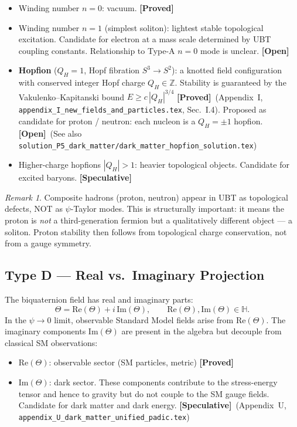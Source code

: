 \documentclass[12pt,a4paper]{article}
\theoremstyle{remark}
\newtheorem{remark}[theorem]{Remark}
\newcommand{\H}{\mathbb{H}}
\newcommand{\Z}{\mathbb{Z}}
\newcommand{\re}{\mathrm{Re}}
\newcommand{\im}{\mathrm{Im}}
\newcommand{\proved}{\textbf{[Proved]}}
\newcommand{\openq}{\textbf{[Open]}}
\newcommand{\speculative}{\textbf{[Speculative]}}
\begin{document}
\begin{itemize}
  \item Winding number $n=0$: vacuum. \proved
  \item Winding number $n=1$ (simplest soliton): lightest stable topological
        excitation.  Candidate for electron at a mass scale determined by UBT
        coupling constants.  Relationship to Type-A $n=0$ mode is unclear.
        \openq
  \item \textbf{Hopfion} ($Q_H=1$, Hopf fibration $S^3\to S^2$): a knotted
        field configuration with conserved integer Hopf charge $Q_H\in\Z$.
        Stability is guaranteed by the Vakulenko--Kapitanski bound
        $E\ge c\,|Q_H|^{3/4}$ \proved\ (Appendix~I,
        \texttt{appendix\_I\_new\_fields\_and\_particles.tex}, Sec.~I.4).
        Proposed as candidate for proton / neutron: each nucleon is a
        $Q_H=\pm 1$ hopfion.  \openq\
        (See also \texttt{solution\_P5\_dark\_matter/dark\_matter\_hopfion\_solution.tex})
  \item Higher-charge hopfions $|Q_H|>1$: heavier topological objects.
        Candidate for excited baryons.  \speculative
\end{itemize}

\begin{remark}
Composite hadrons (proton, neutron) appear in UBT as topological defects, NOT
as $\psi$-Taylor modes.  This is structurally important: it means the proton
is \emph{not} a third-generation fermion but a qualitatively different object
— a soliton.  Proton stability then follows from topological charge
conservation, not from a gauge symmetry.
\end{remark}

\subsection{Type D — Real vs.\ Imaginary Projection}
\label{sec:typeD}

The biquaternion field has real and imaginary parts:
\begin{equation}
  \Theta = \re(\Theta) + i\,\im(\Theta),
  \qquad
  \re(\Theta), \im(\Theta) \in \H.
\end{equation}
In the $\psi\to 0$ limit, observable Standard Model fields arise from
$\re(\Theta)$.  The imaginary components $\im(\Theta)$ are present in the
algebra but decouple from classical SM observations:

\begin{itemize}
  \item $\re(\Theta)$: observable sector (SM particles, metric) \proved
  \item $\im(\Theta)$: dark sector.  These components contribute to the
        stress-energy tensor and hence to gravity but do not couple to the
        SM gauge fields.  Candidate for dark matter and dark energy.
        \speculative\
        (Appendix~U, \texttt{appendix\_U\_dark\_matter\_unified\_padic.tex})
\end{itemize}
\end{document}
